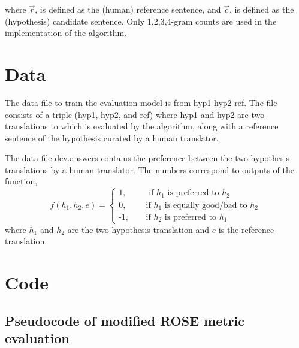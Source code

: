 \documentclass[11pt,letterpaper]{article}
\begin{document}
where $\vec{r}$, is defined as the (human) reference sentence, and $\vec{c}$, is defined as the (hypothesis) candidate sentence. Only 1,2,3,4-gram counts are used in the implementation of the algorithm.

\section{Data}

The data file to train the evaluation model is from hyp1-hyp2-ref. The file consists of a triple (hyp1, hyp2, and ref) where hyp1 and hyp2 are two translations to which is evaluated by the algorithm, along with a reference sentence of the hypothesis curated by a human translator.

The data file dev.answers contains the preference between the two hypothesis translations by a human translator. The numbers correspond to outputs of the function,
	\[ f(h_{1}, h_{2}, e) = 
		\begin{cases}
			\text{1, } &\quad\text{ if $h_{1}$ is preferred to $h_{2}$}\\
			\text{0, } &\quad\text{if $h_{1}$ is equally good/bad to $h_{2}$}\\
			\text{-1, } &\quad\text{if $h_{2}$ is preferred to $h_{1}$ }
		\end{cases} \]
where $h_{1}$ and $h_{2}$ are the two hypothesis translation and $e$ is the reference translation.

\section{Code}

\subsection{Pseudocode of modified ROSE metric evaluation}
\begin{algorithm}
\end{algorithm}
\end{document}
